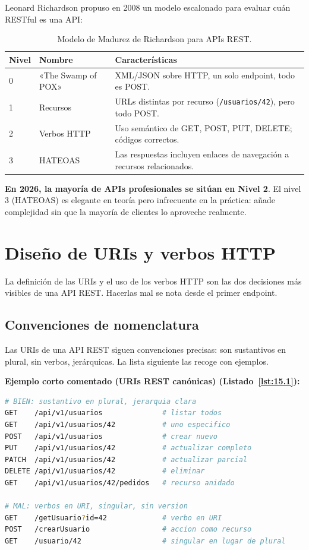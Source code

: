 \documentclass[11pt,a4paper,openany]{book}
\begin{document}
Leonard Richardson propuso en 2008 un modelo escalonado para evaluar
cuán RESTful es una API:

\begin{table}[htbp]
\centering
\caption{Modelo de Madurez de Richardson para APIs REST.}
\footnotesize
\begin{tabularx}{\textwidth}{llX}
\toprule
\textbf{Nivel} & \textbf{Nombre} & \textbf{Características}\\
\midrule
0 & «The Swamp of POX» & XML/JSON sobre HTTP, un solo endpoint, todo es POST.\\
1 & Recursos & URLs distintas por recurso (\texttt{/usuarios/42}), pero todo POST.\\
2 & Verbos HTTP & Uso semántico de GET, POST, PUT, DELETE; códigos correctos.\\
3 & HATEOAS & Las respuestas incluyen enlaces de navegación a recursos relacionados.\\
\bottomrule
\end{tabularx}
\end{table}

\textbf{En 2026, la mayoría de APIs profesionales se sitúan en
Nivel 2}. El nivel 3 (HATEOAS) es elegante en teoría pero
infrecuente en la práctica: añade complejidad sin que la mayoría de
clientes lo aproveche realmente.

\section{Diseño de URIs y verbos HTTP}

La definición de las URIs y el uso de los verbos HTTP son
las dos decisiones más visibles de una API REST. Hacerlas mal se
nota desde el primer endpoint.


\subsection{Convenciones de nomenclatura}

Las URIs de una API REST siguen convenciones precisas: son
sustantivos en plural, sin verbos, jerárquicas. La lista siguiente
las recoge con ejemplos.

\textbf{Ejemplo corto comentado (URIs REST canónicas) (Listado~\ref{lst:15.1}):}
\begin{lstlisting}[language=bash,numbers=none,caption={Ejemplo de Shell},label=lst:15.1]
# BIEN: sustantivo en plural, jerarquia clara
GET    /api/v1/usuarios              # listar todos
GET    /api/v1/usuarios/42           # uno especifico
POST   /api/v1/usuarios              # crear nuevo
PUT    /api/v1/usuarios/42           # actualizar completo
PATCH  /api/v1/usuarios/42           # actualizar parcial
DELETE /api/v1/usuarios/42           # eliminar
GET    /api/v1/usuarios/42/pedidos   # recurso anidado

# MAL: verbos en URI, singular, sin version
GET    /getUsuario?id=42             # verbo en URI
POST   /crearUsuario                 # accion como recurso
GET    /usuario/42                   # singular en lugar de plural
\end{lstlisting}
\end{document}
